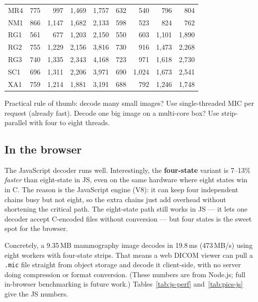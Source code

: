 \documentclass[11pt]{article}
\begin{document}
\begin{table}[htbp]
{\begin{tabular}{l|rrrr|rrrr}
MR4  & 775   & 997   & 1{,}469 & 1{,}757           & 632   & 540     & 796     & 804 \\
NM1  & 866   & 1{,}147 & 1{,}682 & 2{,}133         & 598   & 523     & 824     & 762 \\
RG1  & 561   & 677   & 1{,}203 & 2{,}150           & 550   & 603     & 1{,}101 & 1{,}890 \\
RG2  & 755   & 1{,}229 & 2{,}156 & 3{,}816         & 730   & 916     & 1{,}473 & 2{,}268 \\
RG3  & 740   & 1{,}335 & 2{,}343 & 4{,}168         & 723   & 971     & 1{,}618 & 2{,}730 \\
SC1  & 696   & 1{,}311 & 2{,}206 & 3{,}971         & 690   & 1{,}024 & 1{,}673 & 2{,}541 \\
XA1  & 759   & 1{,}214 & 1{,}881 & 3{,}191         & 688   & 792     & 1{,}246 & 1{,}748 \\
\bottomrule
\end{tabular}}
\end{table}

Practical rule of thumb: decode many small images? Use single-threaded MIC
per request (already fast). Decode one big image on a multi-core box? Use
strip-parallel with four to eight threads.

\subsection{In the browser}

The JavaScript decoder runs well. Interestingly, the \textbf{four-state}
variant is 7--13\% \emph{faster} than eight-state in JS, even on the same
hardware where eight states win in C. The reason is the JavaScript engine
(V8): it can keep four independent chains busy but not eight, so the extra
chains just add overhead without shortening the critical path. The eight-state
path still works in JS --- it lets one decoder accept C-encoded files without
conversion --- but four states is the sweet spot for the browser.

Concretely, a 9.35\,MB mammography image decodes in 19.8\,ms (473\,MB/s) using
eight workers with four-state strips. That means a web DICOM viewer can pull
a \texttt{.mic} file straight from object storage and decode it client-side,
with no server doing compression or format conversion. (These numbers are from
Node.js; full in-browser benchmarking is future work.)
Tables~\ref{tab:js-perf} and~\ref{tab:pics-js} give the JS numbers.
\end{document}
